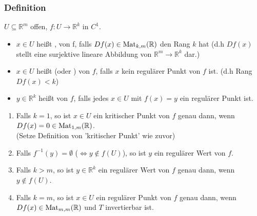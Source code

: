 \subsubsection{Definition} %
\label{ssub:definition}
$ U \subseteq \mathbb{R}^m$ offen, $f: U \to \mathbb{R}^k$ in $C^1$. \\
\begin{itemize}
	\item $x \in U$ heißt , von f, falls $Df(x) \in \operatorname{Mat}_{k,m}(\mathbb{R})$ den Rang $k$ hat (d.h $Df(x)$ stellt eine surjektive lineare Abbildung von $\mathbb{R}^m \to \mathbb{R}^k$ dar.)
	\item $x \in U$ heißt  (oder ) von $f$, falls $x$ kein regulärer Punkt von $f$ ist. (d.h Rang $Df(x) < k$)
	\item $y \in \mathbb{R}^k$ heißt  von $f$, falls jedes $x \in U$ mit $f(x)=y$ ein regulärer Punkt ist.
\end{itemize} 
\begin{enumerate}
	\item Falls $k=1$, so ist $x \in U$ ein kritischer Punkt von $f$ genau dann, wenn $Df(x)=0 \in \operatorname{Mat}_{1,m}(\mathbb{R})$. \\
	(Setze Definition von 'kritischer Punkt' wie zuvor)
	\item Falls $f^{-1}(y)=\emptyset$ ($\Leftrightarrow y \not\in f(U)$), so ist $y$ ein regulärer Wert von $f$.
	\item Falls $k > m$, so ist $y \in \mathbb{R}^k$ ein regulärer Wert von $f$ genau dann, wenn $y \not \in f(U)$.
	\item Falls $k=m$, so ist $x \in U$ ein regulärer Punkt von $f$ genau dann, wenn $Df(x) \in \operatorname{Mat}_{m,m}(\mathbb{R})$ und $T$ invertierbar ist.
\end{enumerate}
